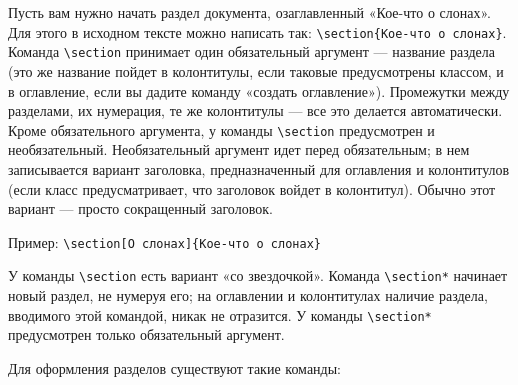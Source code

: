 \documentclass[a4paper,11pt]{article} %
\begin{document}
Пусть вам нужно начать раздел документа, озаглавленный «Кое-что о слонах». Для этого в исходном тексте можно написать так:
\verb"\section{Кое-что о слонах}". Команда \verb"\section" принимает один обязательный аргумент --- название раздела (это же название пойдет в колонтитулы, если таковые предусмотрены классом, и в оглавление, если вы дадите команду «создать оглавление»). Промежутки между разделами, их нумерация, те же колонтитулы --- все это делается автоматически. Кроме обязательного аргумента, у команды \verb"\section" предусмотрен и необязательный. Необязательный аргумент идет перед обязательным; в нем записывается вариант заголовка, предназначенный для оглавления и колонтитулов (если класс предусматривает, что заголовок войдет в колонтитул). Обычно этот вариант — просто сокращенный заголовок.

Пример:
\verb"\section[О слонах]{Кое-что о слонах}"

У команды \verb"\section" есть вариант «со звездочкой». Команда \verb"\section*" начинает новый раздел, не нумеруя его; на оглавлении и колонтитулах наличие раздела, вводимого этой командой, никак не отразится. У команды \verb"\section*" предусмотрен только обязательный аргумент.

Для оформления разделов существуют такие команды:
\end{document}
